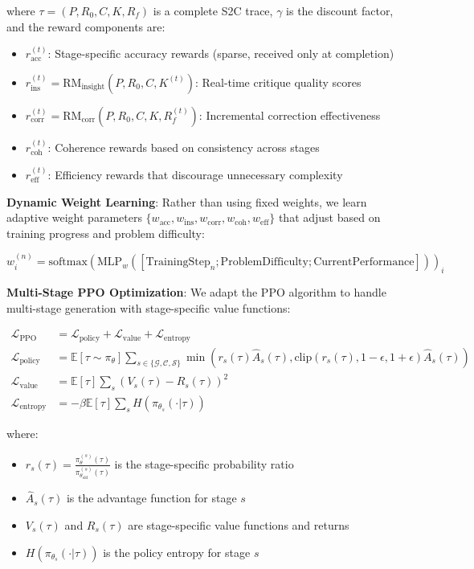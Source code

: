 \documentclass[10pt,twocolumn]{article}
\newcommand{\ssc}{\textsc{S2C}}
\newcommand{\Generator}{\mathcal{G}}
\newcommand{\Critic}{\mathcal{C}}
\newcommand{\Synthesizer}{\mathcal{S}}
\newcommand{\RMinsight}{\text{RM}_{\text{insight}}}
\newcommand{\RMcorr}{\text{RM}_{\text{corr}}}
\newcommand{\expectation}[1]{\mathbb{E}\left[#1\right]}
\begin{document}
where $\tau = (P, R_0, C, K, R_f)$ is a complete \ssc{} trace, $\gamma$ is the discount factor, and the reward components are:

\begin{itemize}[leftmargin=*]
\item $r_{\text{acc}}^{(t)}$: Stage-specific accuracy rewards (sparse, received only at completion)
\item $r_{\text{ins}}^{(t)} = \RMinsight(P, R_0, C, K^{(t)})$: Real-time critique quality scores
\item $r_{\text{corr}}^{(t)} = \RMcorr(P, R_0, C, K, R_f^{(t)})$: Incremental correction effectiveness
\item $r_{\text{coh}}^{(t)}$: Coherence rewards based on consistency across stages
\item $r_{\text{eff}}^{(t)}$: Efficiency rewards that discourage unnecessary complexity
\end{itemize}

\textbf{Dynamic Weight Learning}: Rather than using fixed weights, we learn adaptive weight parameters $\{w_{\text{acc}}, w_{\text{ins}}, w_{\text{corr}}, w_{\text{coh}}, w_{\text{eff}}\}$ that adjust based on training progress and problem difficulty:

\begin{equation}
w_i^{(n)} = \text{softmax}(\text{MLP}_w([\text{TrainingStep}_n; \text{ProblemDifficulty}; \text{CurrentPerformance}]))_i
\end{equation}

\textbf{Multi-Stage PPO Optimization}: We adapt the PPO algorithm to handle multi-stage generation with stage-specific value functions:

\begin{align}
\mathcal{L}_{\text{PPO}} &= \mathcal{L}_{\text{policy}} + \mathcal{L}_{\text{value}} + \mathcal{L}_{\text{entropy}} \\
\mathcal{L}_{\text{policy}} &= \expectation{\tau \sim \pi_\theta}{\sum_{s \in \{\Generator, \Critic, \Synthesizer\}} \min(r_s(\tau) \hat{A}_s(\tau), \text{clip}(r_s(\tau), 1-\epsilon, 1+\epsilon) \hat{A}_s(\tau))} \\
\mathcal{L}_{\text{value}} &= \expectation{\tau}{\sum_{s} (V_s(\tau) - R_s(\tau))^2} \\
\mathcal{L}_{\text{entropy}} &= -\beta \expectation{\tau}{\sum_{s} H(\pi_{\theta_s}(\cdot|\tau))}
\end{align}

where:
\begin{itemize}[leftmargin=*]
\item $r_s(\tau) = \frac{\pi_\theta^{(s)}(\tau)}{\pi_{\theta_{\text{old}}}^{(s)}(\tau)}$ is the stage-specific probability ratio
\item $\hat{A}_s(\tau)$ is the advantage function for stage $s$
\item $V_s(\tau)$ and $R_s(\tau)$ are stage-specific value functions and returns
\item $H(\pi_{\theta_s}(\cdot|\tau))$ is the policy entropy for stage $s$
\end{itemize}
\end{document}

